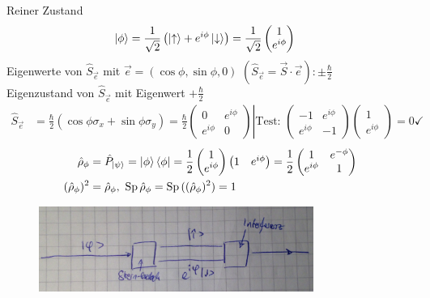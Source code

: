 	Reiner Zustand
		\begin{align*}
			\ket{\phi} &= \frac{1}{\sqrt{2}} \left(
				\ket{\uparrow} + e^{i\phi} \ket{\downarrow}
			\right) = \frac{1}{\sqrt{2}} 
			\begin{pmatrix}
				1 \\
				e^{i\phi}
			\end{pmatrix}
		\end{align*}
	Eigenwerte von $\hat{S}_{\vec{e}}$ mit $\vec{e} = (\cos\phi , \sin \phi, 0)$
	$(\hat{S}_{\vec{e}} = \vec{S} \cdot \vec{e}) : \pm \frac{\hbar}{2}$ \\
	Eigenzustand von $\hat{S}_{\vec{e}}$ mit Eigenwert $+ \frac{\hbar}{2}$ 
		\begin{align*}
			\hat{S}_{\vec{e}} &= 
			\frac{\hbar}{2} \left(
				\cos \phi \sigma_x + \sin \phi \sigma_y 
			\right) = 
			\frac{\hbar}{2}
			\left. 
			\begin{pmatrix}
				0 & e^{i\phi} \\
				e^{i\phi} & 0 
			\end{pmatrix}
			\right| 
			\text{Test: }
			\begin{pmatrix}
				-1 & e^{i\phi} \\
				e^{i\phi} & -1
			\end{pmatrix}
			\begin{pmatrix}
			1 \\
			e^{i\phi}
			\end{pmatrix}
			= 0 \checkmark
		\end{align*}
		\begin{align*}
			\hat{\rho}_\phi &= \hat{P}_{\ket{\psi}} = \ket{\phi} \bra{\phi} 
			= \frac{1}{2} 
			\begin{pmatrix}
				1 \\
				e^{i\phi}
			\end{pmatrix}
			\begin{pmatrix}
				1 & e^{i\phi}
			\end{pmatrix}
			= \frac{1}{2}
			\begin{pmatrix}
				1 & e^{-\phi} \\
				e^{i\phi} & 1
			\end{pmatrix} \\
			(\hat{\rho}_\phi)^2 &= \hat{\rho}_\phi, ~
			\mathrm{Sp}\, \hat{\rho}_\phi = \mathrm{Sp}\, ((\hat{\rho}_\phi)^2) = 1
		\end{align*}
	\begin{figure} [h]
		\begin{center}
			\includegraphics[width=0.8\textwidth]{Statistische_Gemische_und_Dichtematrix2}
		\end{center}
	\end{figure}
	
